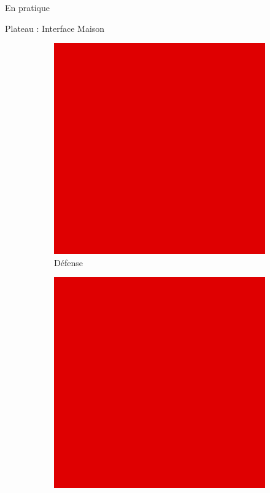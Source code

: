 	\begin{frame}{En pratique}
	    \begin{block}{Plateau : Interface Maison}
	        \begin{figure}
    		    \begin{subfigure}{.48\textwidth}
        		    \centering
        		    \includegraphics[width=.9\linewidth]{images/TODO.png}
                    \caption*{Défense}
                    \label{fig:plateaudefense}
                \end{subfigure}
                \begin{subfigure}{.48\textwidth}
                    \centering
                    \includegraphics[width=.9\linewidth]{images/TODO.png} %

\end{subfigure}
\end{figure}
\end{block}
\end{frame}
